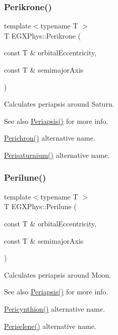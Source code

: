 \subsubsection{\texorpdfstring{Perikrone()}{Perikrone()}}
{\footnotesize\ttfamily template$<$typename T $>$ \\
T E\+G\+X\+Phys\+::\+Perikrone (\begin{DoxyParamCaption}\item[{const T \&}]{orbital\+Eccentricity,  }\item[{const T \&}]{semimajor\+Axis }\end{DoxyParamCaption})}



Calculates periapsis around Saturn. 

\begin{DoxySeeAlso}{See also}
\hyperlink{group___e_g_x_phys-_periapsis_ga4414ac75539371ec874a3d25cad6c9fe}{Periapsis()} for more info. 

\hyperlink{group___e_g_x_phys-_periapsis_ga12b5e99aa2e3e7031ef6ce93060cf516}{Perichron()} alternative name. 

\hyperlink{group___e_g_x_phys-_periapsis_ga60a50d09d29ebe47cbbfc125c2ea42bf}{Perisaturnium()} alternative name. 
\end{DoxySeeAlso}
\mbox{\label{group___e_g_x_phys-_periapsis_ga2cc7ab05e18d32c94d8d74972e032793}} 
\subsubsection{\texorpdfstring{Perilune()}{Perilune()}}
{\footnotesize\ttfamily template$<$typename T $>$ \\
T E\+G\+X\+Phys\+::\+Perilune (\begin{DoxyParamCaption}\item[{const T \&}]{orbital\+Eccentricity,  }\item[{const T \&}]{semimajor\+Axis }\end{DoxyParamCaption})}



Calculates periapsis around Moon. 

\begin{DoxySeeAlso}{See also}
\hyperlink{group___e_g_x_phys-_periapsis_ga4414ac75539371ec874a3d25cad6c9fe}{Periapsis()} for more info. 

\hyperlink{group___e_g_x_phys-_periapsis_gaeeba153b188cd06cbd233eaef12f0a6a}{Pericynthion()} alternative name. 

\hyperlink{group___e_g_x_phys-_periapsis_ga255874374dde571531e443cdbef9ef0c}{Periselene()} alternative name. 
\end{DoxySeeAlso}
\mbox{\label{group___e_g_x_phys-_periapsis_ga99d86af90179994e17158b082c502fd4}} 
